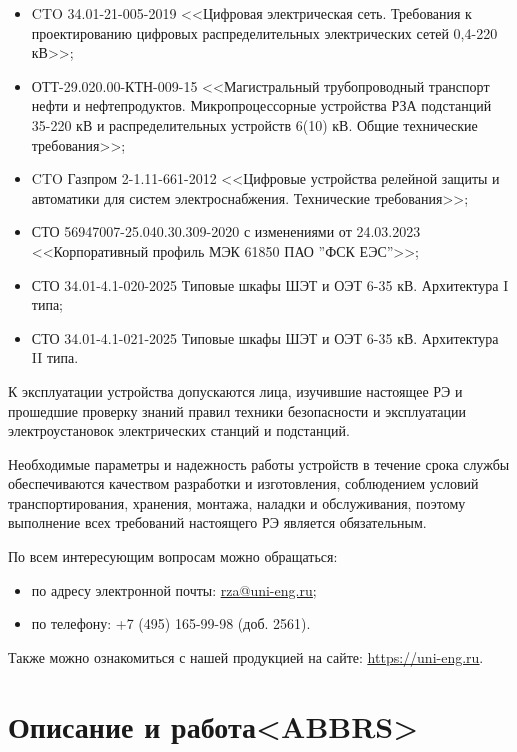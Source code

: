 \documentclass[a4paper, 12pt,table, hidelinks, DIV=calc]{extarticle} %
\begin{document}
\begin{itemize}
\item CTO 34.01-21-005-2019 <<Цифровая электрическая сеть. Требования к проектированию цифровых распределительных электрических сетей 0,4-220 кВ>>;
\item \sloppy ОТТ-29.020.00-КТН-009-15 <<Магистральный трубопроводный транспорт нефти и нефтепродуктов. Микропроцессорные устройства РЗА подстанций 35-220 кВ и распределительных устройств 6(10) кВ. Общие технические требования>>;
\item CTO Газпром 2-1.11-661-2012 <<Цифровые устройства релейной защиты и автоматики для систем электроснабжения. Технические требования>>;
\item СТО 56947007-25.040.30.309-2020 с изменениями от 24.03.2023 <<Корпоративный профиль МЭК 61850 ПАО ''ФСК ЕЭС''>>;
\item СТО 34.01-4.1-020-2025 Типовые шкафы ШЭТ и ОЭТ 6-35 кВ. Архитектура I типа;
\item СТО 34.01-4.1-021-2025 Типовые шкафы ШЭТ и ОЭТ 6-35 кВ. Архитектура II типа.

\end{itemize}

\par
К эксплуатации устройства допускаются лица, изучившие настоящее РЭ и прошедшие проверку знаний правил техники безопасности и эксплуатации электроустановок электрических станций и подстанций.

\par
Необходимые параметры и надежность работы устройств в течение срока службы обеспечиваются качеством разработки и изготовления, соблюдением условий транспортирования, хранения, монтажа, наладки и обслуживания, поэтому выполнение всех требований настоящего РЭ является обязательным.
\par
По всем интересующим вопросам можно обращаться:
\begin{itemize}
\item по адресу электронной почты: \href{mailto:rza@uni-eng.ru}{\color{uniblue}\uline{rza@uni-eng.ru}};
\item по телефону: +7 (495) 165-99-98 (доб. 2561).
\end{itemize}
Также можно ознакомиться с нашей продукцией на сайте: \href{https://uni-eng.ru}{\color{uniblue}\uline{https://uni-eng.ru}}.

\newpage
\color{uniblue}\section[Описание и работа]{Описание и работа\color{white!0}<ABBRS>} %
\color{black}
\end{document}
